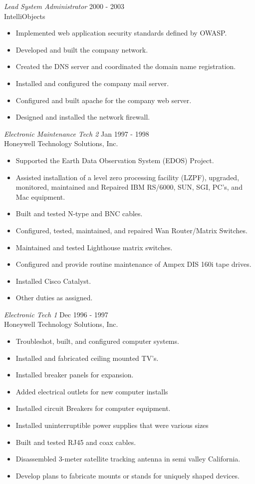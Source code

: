 \documentclass[margin, 10pt]{res} %
\begin{document}
\begin{resume}
{\sl Lead System Administrator } \hfill 2000 - 2003 \\
IntelliObjects
\begin{itemize}
  \item Implemented web application security standards defined by OWASP.
  \item Developed and built the company network.
  \item Created the DNS server and coordinated the domain name registration.
  \item Installed and configured the company mail server.
  \item Configured and built apache for the company web server.
  \item Designed and installed the network firewall.
\end{itemize}

{\sl Electronic Maintenance Tech 2 } \hfill Jan 1997 - 1998 \\
Honeywell Technology Solutions, Inc.
\begin{itemize} \itemsep -2pt %
  \item Supported the Earth Data Observation System (EDOS) Project.
  \item Assisted installation of a level zero processing facility (LZPF), upgraded, monitored, maintained and Repaired IBM RS/6000, SUN, SGI, PC's, and Mac equipment.
  \item Built and tested N-type and BNC cables.
  \item Configured, tested, maintained, and repaired Wan Router/Matrix Switches.
  \item Maintained and tested Lighthouse matrix switches.
  \item Configured and provide routine maintenance of Ampex DIS 160i tape drives.
  \item Installed Cisco Catalyst.
  \item Other duties as assigned.
\end{itemize}

{\sl Electronic Tech 1} \hfill Dec 1996 - 1997\\
Honeywell Technology Solutions, Inc.
\begin{itemize}
  \item Troubleshot, built, and configured computer systems.
  \item Installed and fabricated ceiling mounted TV's.
  \item Installed breaker panels for expansion.
  \item Added electrical outlets for new computer installs
  \item Installed circuit Breakers for computer equipment.
  \item Installed uninterruptible power supplies that were various sizes
  \item Built and tested RJ45 and coax cables.
  \item Disassembled 3-meter satellite tracking antenna in semi valley California.
  \item Develop plans to fabricate mounts or stands for uniquely shaped devices.
\end{itemize}


\end{resume}
\end{document}

